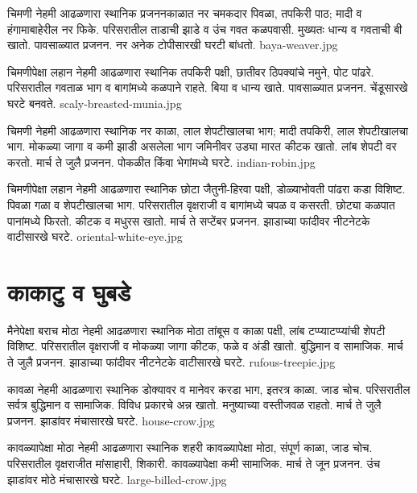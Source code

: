 \documentclass[aspectratio=169]{beamer}
\begin{document}
{चिमणी}
{नेहमी आढळणारा स्थानिक}
{प्रजननकाळात नर चमकदार पिवळा, तपकिरी पाठ; मादी व हंगामाबाहेरील नर फिके.}
{परिसरातील ताडाची झाडे व उंच गवत}
{कळपवासी. मुख्यतः धान्य व गवताची बी खातो.}
{पावसाळ्यात प्रजनन. नर अनेक टोपीसारखी घरटी बांधतो.}
{baya-weaver.jpg}

{चिमणीपेक्षा लहान}
{नेहमी आढळणारा स्थानिक}
{तपकिरी पक्षी, छातीवर ठिपक्यांचे नमुने, पोट पांढरे.}
{परिसरातील गवताळ भाग व बागांमध्ये}
{कळपाने राहते. बिया व धान्य खाते.}
{पावसाळ्यात प्रजनन. चेंडूसारखे घरटे बनवते.}
{scaly-breasted-munia.jpg}

{चिमणी}
{नेहमी आढळणारा स्थानिक}
{नर काळा, लाल शेपटीखालचा भाग; मादी तपकिरी, लाल शेपटीखालचा भाग.}
{मोकळ्या जागा व कमी झाडी असलेला भाग}
{जमिनीवर उड्या मारत कीटक खातो. लांब शेपटी वर करतो.}
{मार्च ते जुलै प्रजनन. पोकळीत किंवा भेगांमध्ये घरटे.}
{indian-robin.jpg}

{चिमणीपेक्षा लहान}
{नेहमी आढळणारा स्थानिक}
{छोटा जैतुनी-हिरवा पक्षी, डोळ्याभोवती पांढरा कडा विशिष्ट. पिवळा गळा व शेपटीखालचा भाग.}
{परिसरातील वृक्षराजी व बागांमध्ये}
{चपळ व कसरती. छोट्या कळपात पानांमध्ये फिरतो. कीटक व मधुरस खातो.}
{मार्च ते सप्टेंबर प्रजनन. झाडाच्या फांदीवर नीटनेटके वाटीसारखे घरटे.}
{oriental-white-eye.jpg}

\section{काकाटु व घुबडे}
{मैनेपेक्षा बराच मोठा}
{नेहमी आढळणारा स्थानिक}
{मोठा तांबूस व काळा पक्षी, लांब टप्प्याटप्प्यांची शेपटी विशिष्ट.}
{परिसरातील वृक्षराजी व मोकळ्या जागा}
{कीटक, फळे व अंडी खातो. बुद्धिमान व सामाजिक.}
{मार्च ते जुलै प्रजनन. झाडाच्या फांदीवर नीटनेटके वाटीसारखे घरटे.}
{rufous-treepie.jpg}

{कावळा}
{नेहमी आढळणारा स्थानिक}
{डोक्यावर व मानेवर करडा भाग, इतरत्र काळा. जाड चोच.}
{परिसरातील सर्वत्र}
{बुद्धिमान व सामाजिक. विविध प्रकारचे अन्न खातो. मनुष्याच्या वस्तीजवळ राहतो.}
{मार्च ते जुलै प्रजनन. झाडांवर मंचासारखे घरटे.}
{house-crow.jpg}

{कावळ्यापेक्षा मोठा}
{नेहमी आढळणारा स्थानिक}
{शहरी कावळ्यापेक्षा मोठा, संपूर्ण काळा, जाड चोच.}
{परिसरातील वृक्षराजीत}
{मांसाहारी, शिकारी. कावळ्यापेक्षा कमी सामाजिक.}
{मार्च ते जून प्रजनन. उंच झाडांवर मोठे मंचासारखे घरटे.}
{large-billed-crow.jpg}
\end{document}
